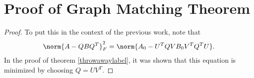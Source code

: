 \documentclass[12pt]{article}
\begin{document}
\section{Proof of Graph Matching Theorem}
\begin{proof}
  To put this in the context of the previous work, note that
  \begin{align}
    \norm{A - QBQ^T}_F^2 = \norm{A_0 - U^TQVB_0V^TQ^TU}.
  \end{align}
  In the proof of theorem \ref{throwawaylabel}, it was shown that this equation is minimized by choosing $Q = UV^T$.
\end{proof}
 
\end{document}
